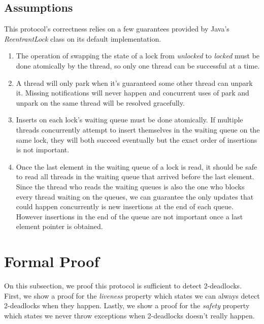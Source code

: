 \subsection{Assumptions}
This protocol's correctness relies on a few guarantees provided by Java's \emph{ReentrantLock} class on its default implementation.
\begin{enumerate}
\item The operation of swapping the state of a lock from \emph{unlocked} to \emph{locked} must be done atomically by the thread, so only one thread can be successful at a time.
\item A thread will only park when it's guaranteed some other thread can unpark it. Missing notifications will never happen and concurrent uses of park and unpark on the same thread will be resolved gracefully.
\item Inserts on each lock's waiting queue must be done atomically. If multiple threads concurrently attempt to insert themselves in the waiting queue on the same lock, they will both succeed eventually but the exact order of insertions is not important.
\item Once the last element in the waiting queue of a lock is read, it should be safe to read all threads in the waiting queue that arrived before the last element. Since the thread who reads the waiting queues is also the one who blocks every thread waiting on the queues, we can guarantee the only updates that could happen concurrently is new insertions at the end of each queue. However insertions in the end of the queue are not important once a last element pointer is obtained.
\end{enumerate}

\section{Formal Proof}
On this subsection, we proof this protocol is sufficient to detect 2-deadlocks.
First, we show a proof for the \emph{liveness} property which states we can always detect 2-deadlocks when they happen.
Lastly, we show a proof for the \emph{safety} property which states we never throw exceptions when 2-deadlocks doesn't really happen.

